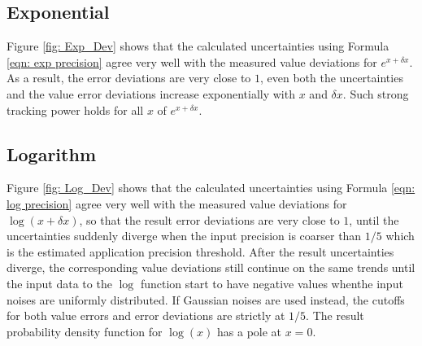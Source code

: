 \documentclass[twoside]{article}
\numberwithin{equation}{section}
\begin{document}
\subsection{Exponential}

Figure \ref{fig: Exp_Dev} shows that the calculated uncertainties using Formula \eqref{eqn: exp precision} agree very well with the measured value deviations for $e^{x + \delta x}$.
As a result, the error deviations are very close to $1$, even both the uncertainties and the value error deviations increase exponentially with $x$ and $\delta x$.
Such strong tracking power holds for all $x$ of $e^{x + \delta x}$. 

\subsection{Logarithm}

Figure \ref{fig: Log_Dev} shows that the calculated uncertainties using Formula \eqref{eqn: log precision} agree very well with the measured value deviations for $\log(x + \delta x)$, so that the result error deviations are very close to $1$, until the uncertainties suddenly diverge when the input precision is coarser than $1/5$ which is the estimated application precision threshold.
After the result uncertainties diverge, the corresponding value deviations still continue on the same trends until the input data to the $\log$ function start to have negative values whenthe input noises are uniformly distributed.
If Gaussian noises are used instead, the cutoffs for both value errors and error deviations are strictly at $1/5$.
The result probability density function for $\log(x)$ has a pole at $x=0$.
\end{document}
